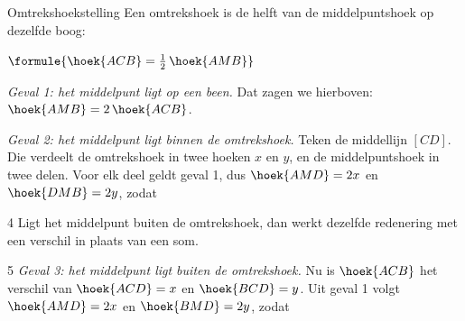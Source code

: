\begin{theorie}
\begin{stelling}{Omtrekshoekstelling}
Een omtrekshoek is de helft van de middelpuntshoek op dezelfde boog:

\vspace{1mm}
\qquad $\formule{\hoek{ACB} = \tfrac12\,\hoek{AMB}}$
\end{stelling}

\begin{bewijs}
\begin{minipage}[t]{\dimexpr\linewidth-\alleenvoor{4}{3.4cm}\alleenvoor{5}{6.1cm}\relax}
\vspace{0pt}
\textit{Geval 1: het middelpunt ligt op een been.} Dat zagen we hierboven: $\hoek{AMB} = 2\,\hoek{ACB}$.

\textit{Geval 2: het middelpunt ligt binnen de omtrekshoek.} Teken de middellijn $[CD]$. Die verdeelt de omtrekshoek in twee hoeken $x$ en $y$, en de middelpuntshoek in twee delen. Voor elk deel geldt geval 1, dus $\hoek{AMD} = 2x$ en $\hoek{DMB} = 2y$, zodat
\begin{alleenvoor}{4}
Ligt het middelpunt buiten de omtrekshoek, dan werkt dezelfde redenering met een verschil in plaats van een som.
\end{alleenvoor}
\begin{alleenvoor}{5}
\textit{Geval 3: het middelpunt ligt buiten de omtrekshoek.} Nu is $\hoek{ACB}$ het verschil van $\hoek{ACD} = x$ en $\hoek{BCD} = y$. Uit geval 1 volgt $\hoek{AMD} = 2x$ en $\hoek{BMD} = 2y$, zodat
\end{alleenvoor}
\end{minipage}\hfill
\begin{minipage}[t]{\alleenvoor{4}{3.1cm}\alleenvoor{5}{5.8cm}}
\vspace{0pt}
\centering
{}%
\end{minipage}
\end{bewijs}
\end{theorie}

